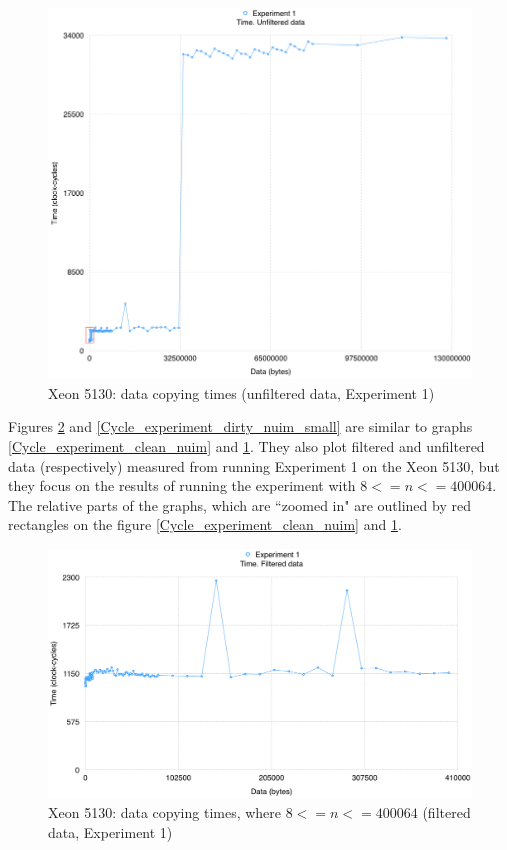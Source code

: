 \begin{figure}[!htb]
\centering
\includegraphics[width=145mm]{6/Cycle_experiment_dirty_nuim.png}
\caption{Xeon 5130: data copying times (unfiltered data, Experiment 1)}
\label{Cycle_experiment_dirty_nuim}
\end{figure}

Figures \ref{Cycle_experiment_clean_nuim_small} and \ref{Cycle_experiment_dirty_nuim_small} are similar to graphs \ref{Cycle_experiment_clean_nuim} and \ref{Cycle_experiment_dirty_nuim}. They also plot filtered and unfiltered data (respectively) measured from running Experiment 1 on the Xeon 5130, but they focus on the results of running the experiment with $8 <= n <= 400064$. The relative parts of the graphs, which are ``zoomed in" are outlined by red rectangles on the figure \ref{Cycle_experiment_clean_nuim} and \ref{Cycle_experiment_dirty_nuim}.

\begin{figure}[!htb]
\centering
\includegraphics[width=145mm]{6/Cycle_experiment_clean_nuim_small.png}
\caption{Xeon 5130: data copying times, where $8 <= n <= 400064$ (filtered data, Experiment 1)}
\label{Cycle_experiment_clean_nuim_small}
\end{figure}

